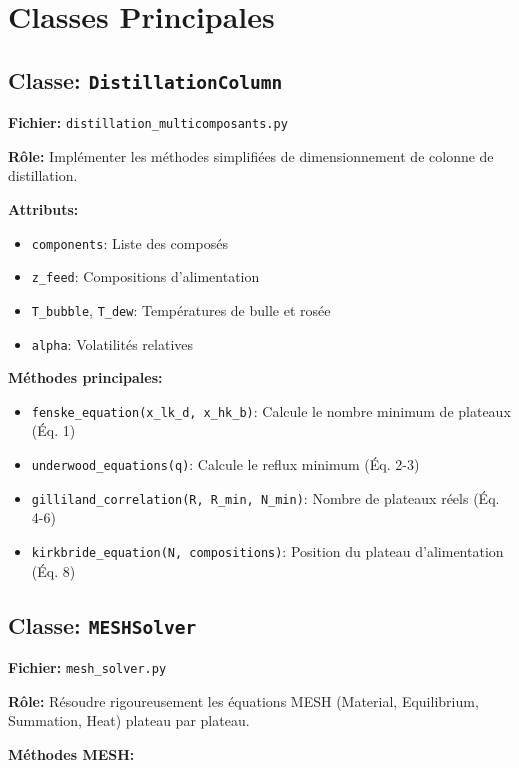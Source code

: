 \documentclass[11pt,a4paper]{article}
\begin{document}
\section{Classes Principales}

\subsection{Classe: \texttt{DistillationColumn}}

\textbf{Fichier:} \texttt{distillation\_multicomposants.py}

\textbf{Rôle:} Implémenter les méthodes simplifiées de dimensionnement de colonne de distillation.

\textbf{Attributs:}
\begin{itemize}
\item \texttt{components}: Liste des composés
\item \texttt{z\_feed}: Compositions d'alimentation
\item \texttt{T\_bubble}, \texttt{T\_dew}: Températures de bulle et rosée
\item \texttt{alpha}: Volatilités relatives
\end{itemize}

\textbf{Méthodes principales:}

\begin{itemize}
\item \texttt{fenske\_equation(x\_lk\_d, x\_hk\_b)}: Calcule le nombre minimum de plateaux (Éq. 1)
\item \texttt{underwood\_equations(q)}: Calcule le reflux minimum (Éq. 2-3)
\item \texttt{gilliland\_correlation(R, R\_min, N\_min)}: Nombre de plateaux réels (Éq. 4-6)
\item \texttt{kirkbride\_equation(N, compositions)}: Position du plateau d'alimentation (Éq. 8)
\end{itemize}

\subsection{Classe: \texttt{MESHSolver}}

\textbf{Fichier:} \texttt{mesh\_solver.py}

\textbf{Rôle:} Résoudre rigoureusement les équations MESH (Material, Equilibrium, Summation, Heat) plateau par plateau.

\textbf{Méthodes MESH:}
\end{document}
